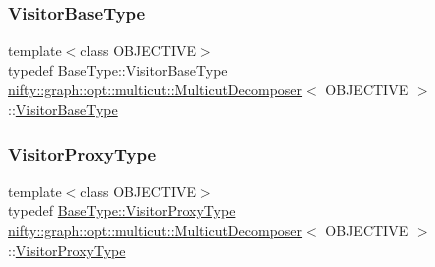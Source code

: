 \subsubsection{\texorpdfstring{Visitor\+Base\+Type}{VisitorBaseType}}
{\footnotesize\ttfamily template$<$class O\+B\+J\+E\+C\+T\+I\+VE$>$ \\
typedef Base\+Type\+::\+Visitor\+Base\+Type \hyperlink{classnifty_1_1graph_1_1opt_1_1multicut_1_1MulticutDecomposer}{nifty\+::graph\+::opt\+::multicut\+::\+Multicut\+Decomposer}$<$ O\+B\+J\+E\+C\+T\+I\+VE $>$\+::\hyperlink{classnifty_1_1graph_1_1opt_1_1multicut_1_1MulticutDecomposer_aa922f216a5bf815efc8b3926d417ef67}{Visitor\+Base\+Type}}

\mbox{\label{classnifty_1_1graph_1_1opt_1_1multicut_1_1MulticutDecomposer_a5d8e8a7b32ca991c452efbf46e5271f2}} 
\subsubsection{\texorpdfstring{Visitor\+Proxy\+Type}{VisitorProxyType}}
{\footnotesize\ttfamily template$<$class O\+B\+J\+E\+C\+T\+I\+VE$>$ \\
typedef \hyperlink{classnifty_1_1graph_1_1opt_1_1common_1_1SolverBase_ad209b469b3bc9fc0fc14e9fed4d09075}{Base\+Type\+::\+Visitor\+Proxy\+Type} \hyperlink{classnifty_1_1graph_1_1opt_1_1multicut_1_1MulticutDecomposer}{nifty\+::graph\+::opt\+::multicut\+::\+Multicut\+Decomposer}$<$ O\+B\+J\+E\+C\+T\+I\+VE $>$\+::\hyperlink{classnifty_1_1graph_1_1opt_1_1multicut_1_1MulticutDecomposer_a5d8e8a7b32ca991c452efbf46e5271f2}{Visitor\+Proxy\+Type}}

\mbox{\label{classnifty_1_1graph_1_1opt_1_1multicut_1_1MulticutDecomposer_a9834b97c23c60efe89b26261fc033a75}} 
